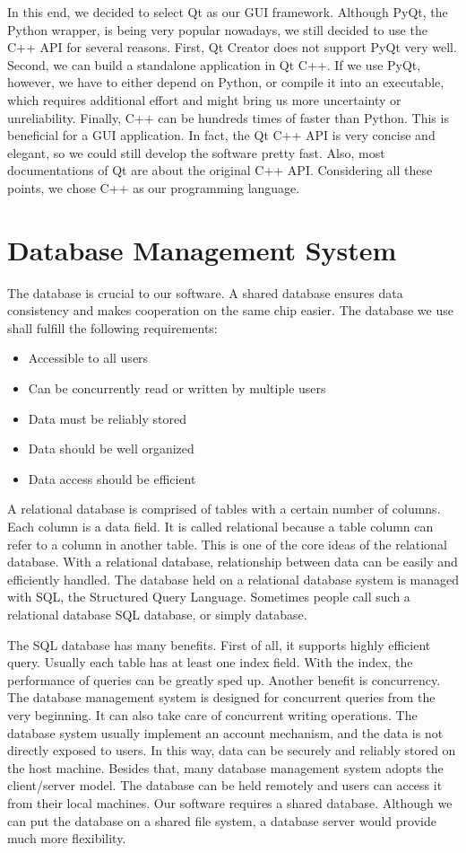 In this end, we decided to select Qt as our GUI framework. Although PyQt, the Python wrapper, is being very popular nowadays, we still decided to use the C++ API for several reasons. First, Qt Creator does not support PyQt very well. Second, we can build a standalone application in Qt C++. If we use PyQt, however, we have to either depend on Python, or compile it into an executable, which requires additional effort and might bring us more uncertainty or unreliability. Finally, C++ can be hundreds times of faster than Python. This is beneficial for a GUI application. In fact, the Qt C++ API is very concise and elegant, so we could still develop the software pretty fast. Also, most documentations of Qt are about the original C++ API. Considering all these points, we chose C++ as our programming language.

\section{Database Management System}
The database is crucial to our software. A shared database ensures data consistency and makes cooperation on the same chip easier. The database we use shall fulfill the following requirements:
\begin{itemize}
\item Accessible to all users
\item Can be concurrently read or written by multiple users
\item Data must be reliably stored
\item Data should be well organized
\item Data access should be efficient
\end{itemize}

A relational database is comprised of tables with a certain number of columns. Each column is a data field. It is called relational because a table column can refer to a column in another table. This is one of the core ideas of the relational database. With a relational database, relationship between data can be easily and efficiently handled. The database held on a relational database system is managed with SQL, the Structured Query Language. Sometimes people call such a relational database SQL database, or simply database. 

The SQL database has many benefits. First of all, it supports highly efficient query. Usually each table has at least one index field. With the index, the performance of queries can be greatly sped up. Another benefit is concurrency. The database management system is designed for concurrent queries from the very beginning. It can also take care of concurrent writing operations. The database system usually implement an account mechanism, and the data is not directly exposed to users. In this way, data can be securely and reliably stored on the host machine. Besides that, many database management system adopts the client/server model. The database can be held remotely and users can access it from their local machines. Our software requires a shared database. Although we can put the database on a shared file system, a database server would provide much more flexibility.

